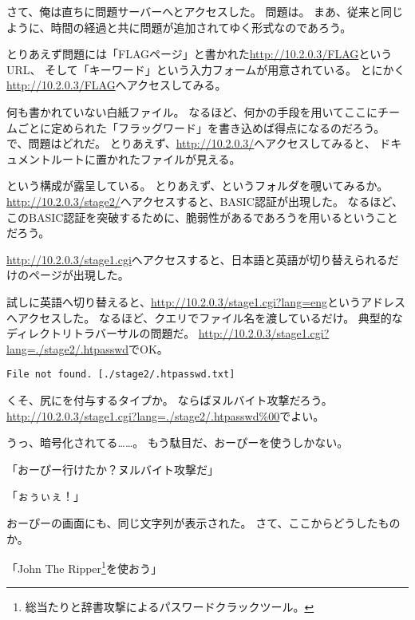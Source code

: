 さて、俺は直ちに問題サーバーへとアクセスした。
問題は。
まあ、従来と同じように、時間の経過と共に問題が追加されてゆく形式なのであろう。

とりあえず問題には「FLAGページ」と書かれた\url{http://10.2.0.3/FLAG}というURL、
そして「キーワード」という入力フォームが用意されている。
とにかく\url{http://10.2.0.3/FLAG}へアクセスしてみる。

何も書かれていない白紙ファイル。
なるほど、何かの手段を用いてここにチームごとに定められた「フラッグワード」を書き込めば得点になるのだろう。
で、問題はどれだ。
とりあえず、\url{http://10.2.0.3/}へアクセスしてみると、
ドキュメントルートに置かれたファイルが見える。


という構成が露呈している。
とりあえず、というフォルダを覗いてみるか。
\url{http://10.2.0.3/stage2/}へアクセスすると、BASIC認証が出現した。
なるほど、このBASIC認証を突破するために、脆弱性があるであろうを用いるということだろう。

\url{http://10.2.0.3/stage1.cgi}へアクセスすると、日本語と英語が切り替えられるだけのページが出現した。



試しに英語へ切り替えると、\url{http://10.2.0.3/stage1.cgi?lang=eng}というアドレスへアクセスした。
なるほど、クエリでファイル名を渡しているだけ。
典型的なディレクトリトラバーサルの問題だ。
\url{http://10.2.0.3/stage1.cgi?lang=./stage2/.htpasswd}でOK。

\begin{lstlisting}
File not found. [./stage2/.htpasswd.txt]
\end{lstlisting}

くそ、尻にを付与するタイプか。
ならばヌルバイト攻撃だろう。
\url{http://10.2.0.3/stage1.cgi?lang=./stage2/.htpasswd%00}でよい。



うっ、暗号化されてる……。
もう駄目だ、おーぴーを使うしかない。

「おーぴー行けたか？ヌルバイト攻撃だ」

「ぉぅぃぇ！」

おーぴーの画面にも、同じ文字列が表示された。
さて、ここからどうしたものか。

「John The Ripper\footnote{総当たりと辞書攻撃によるパスワードクラックツール。}を使おう」

